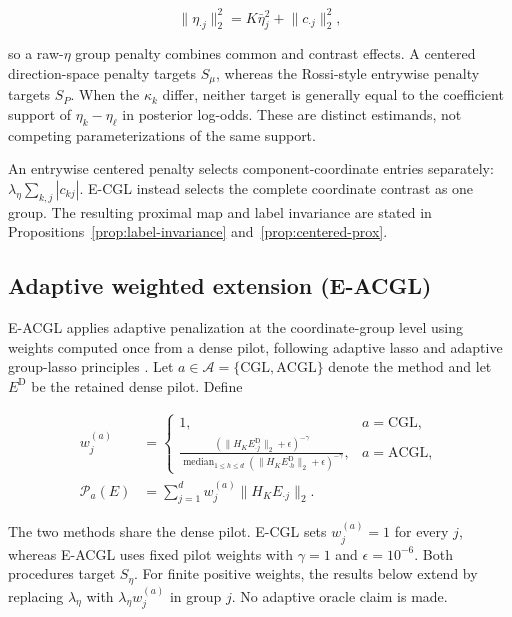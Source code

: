 \documentclass[preprint,12pt,authoryear]{elsarticle}
\begin{document}
\[
\lVert\eta_{\cdot j}\rVert_2^2
=K\bar\eta_j^2+\lVert c_{\cdot j}\rVert_2^2,
\]

so a raw-$\eta$ group penalty combines common and contrast effects. A
centered direction-space penalty targets $S_\mu$, whereas the Rossi-style
entrywise penalty targets $S_P$. When the $\kappa_k$ differ, neither target is
generally equal to the coefficient support of $\eta_k-\eta_\ell$ in posterior
log-odds. These are distinct estimands, not competing parameterizations of the
same support.

An entrywise centered penalty selects component-coordinate entries separately:
\(
\lambda_\eta\sum_{k,j}|c_{kj}|.
\)
E-CGL instead selects the complete coordinate contrast as one group. The
resulting proximal map and label invariance are stated in
Propositions~\ref{prop:label-invariance} and~\ref{prop:centered-prox}.

\subsection{Adaptive weighted extension (E-ACGL)}

E-ACGL applies adaptive penalization at the coordinate-group level using
weights computed once from a dense pilot, following adaptive lasso and
adaptive group-lasso principles \citep{zou2006adaptive,wang2008adaptivegroup}.
Let
$a\in\mathcal A=\{\mathrm{CGL},\mathrm{ACGL}\}$ denote the method and let
$E^{\mathrm D}$ be the retained dense pilot. Define

\begin{equation}
\label{eq:eacgl-penalty}
\begin{aligned}
w_j^{(a)}
&=
\begin{cases}
1,
&a=\mathrm{CGL},\\[4pt]
\displaystyle
\frac{
\left(\lVert H_KE_{\cdot j}^{\mathrm D}\rVert_2+\epsilon\right)^{-\gamma}
}{
\operatorname{median}_{1\leq h\leq d}
\left(\lVert H_KE_{\cdot h}^{\mathrm D}\rVert_2+\epsilon\right)^{-\gamma}
},
&a=\mathrm{ACGL},
\end{cases}\\
\mathcal P_a(E)
&=\sum_{j=1}^d
w_j^{(a)}\lVert H_KE_{\cdot j}\rVert_2.
\end{aligned}
\end{equation}

The two methods share the dense pilot. E-CGL sets $w_j^{(a)}=1$ for every
$j$, whereas E-ACGL uses fixed pilot weights with $\gamma=1$ and
$\epsilon=10^{-6}$. Both procedures target $S_\eta$. For finite positive
weights, the results below extend by
replacing $\lambda_\eta$ with $\lambda_\eta w_j^{(a)}$ in group $j$. No
adaptive oracle claim is made.
\end{document}
